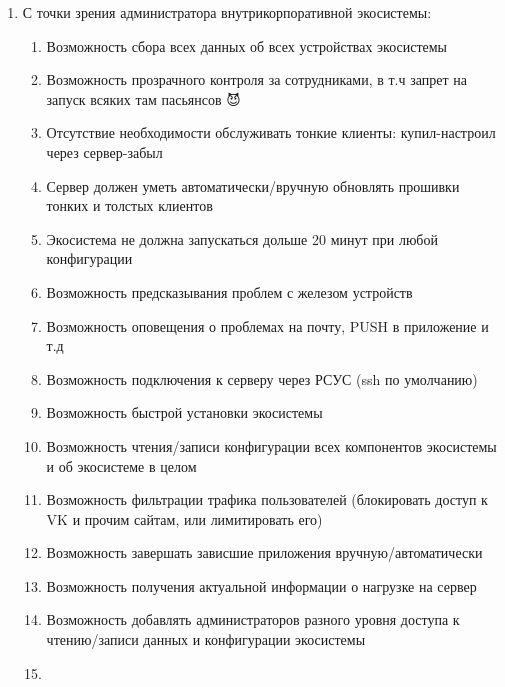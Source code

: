 \begin{enumerate}
   \item С точки зрения администратора внутрикорпоративной экосистемы:
   \begin{enumerate}
      \item Возможность сбора всех данных об всех устройствах экосистемы
      \item Возможность прозрачного контроля за сотрудниками, в т.ч запрет на запуск всяких там пасьянсов 😈
      \item Отсутствие необходимости обслуживать тонкие клиенты: купил-настроил через сервер-забыл
      \item Сервер должен уметь автоматически/вручную обновлять прошивки тонких и толстых клиентов
      \item Экосистема не должна запускаться дольше 20 минут при любой конфигурации
      \item Возможность предсказывания проблем с железом устройств
      \item Возможность оповещения о проблемах на почту, PUSH в приложение и т.д
      \item Возможность подключения к серверу через РСУС (ssh по умолчанию)
      \item Возможность быстрой установки экосистемы
      \item Возможность чтения/записи конфигурации всех компонентов экосистемы и об экосистеме в целом
      \item Возможность фильтрации трафика пользователей (блокировать доступ к VK и прочим сайтам, или лимитировать его)
      \item Возможность завершать зависшие приложения вручную/автоматически
      \item Возможность получения актуальной информации о нагрузке на сервер
      \item Возможность добавлять администраторов разного уровня доступа к чтению/записи данных и конфигурации экосистемы
      \item 
   \end{enumerate}
\end{enumerate}
